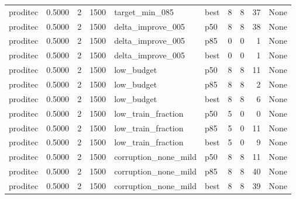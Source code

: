 \begin{tabular}{lrrrllrrrl}
proditec &    0.5000 &    2 &   1500 &       target\_min\_085 &   best &               8 &          8 &      37 &                                               None \\
proditec &    0.5000 &    2 &   1500 &    delta\_improve\_005 &    p50 &               8 &          8 &      38 &                                               None \\
proditec &    0.5000 &    2 &   1500 &    delta\_improve\_005 &    p85 &               0 &          0 &       1 &                                               None \\
proditec &    0.5000 &    2 &   1500 &    delta\_improve\_005 &   best &               0 &          0 &       1 &                                               None \\
proditec &    0.5000 &    2 &   1500 &           low\_budget &    p50 &               8 &          8 &      11 &                                               None \\
proditec &    0.5000 &    2 &   1500 &           low\_budget &    p85 &               8 &          8 &       2 &                                               None \\
proditec &    0.5000 &    2 &   1500 &           low\_budget &   best &               8 &          8 &       6 &                                               None \\
proditec &    0.5000 &    2 &   1500 &   low\_train\_fraction &    p50 &               5 &          0 &       0 &                                               None \\
proditec &    0.5000 &    2 &   1500 &   low\_train\_fraction &    p85 &               5 &          0 &      11 &                                               None \\
proditec &    0.5000 &    2 &   1500 &   low\_train\_fraction &   best &               5 &          0 &       9 &                                               None \\
proditec &    0.5000 &    2 &   1500 & corruption\_none\_mild &    p50 &               8 &          8 &      11 &                                               None \\
proditec &    0.5000 &    2 &   1500 & corruption\_none\_mild &    p85 &               8 &          8 &      40 &                                               None \\
proditec &    0.5000 &    2 &   1500 & corruption\_none\_mild &   best &               8 &          8 &      39 &                                               None \\

\end{tabular}
